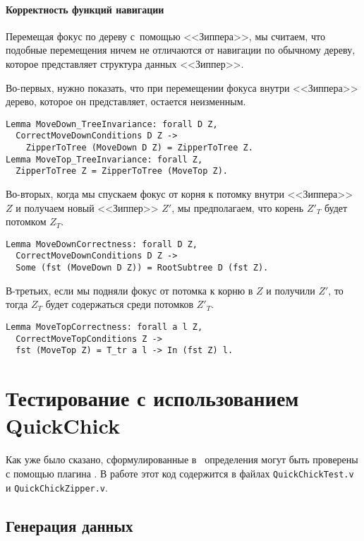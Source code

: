 \paragraph{Корректность функций навигации}

Перемещая фокус по дереву с~помощью <<Зиппера>>, мы считаем, что подобные перемещения ничем не отличаются от навигации по обычному дереву, которое представляет структура данных <<Зиппер>>.

Во-первых, нужно показать, что при перемещении фокуса внутри <<Зиппера>> дерево, которое он представляет, остается неизменным.

\begin{Verbatim}[fontsize=\small]
Lemma MoveDown_TreeInvariance: forall D Z,
  CorrectMoveDownConditions D Z ->
  	ZipperToTree (MoveDown D Z) = ZipperToTree Z.
Lemma MoveTop_TreeInvariance: forall Z,
  ZipperToTree Z = ZipperToTree (MoveTop Z).
\end{Verbatim}

Во-вторых, когда мы спускаем фокус от корня к потомку внутри <<Зиппера>> $Z$ и получаем новый <<Зиппер>> $Z'$, мы предполагаем, что корень $Z'_T$ будет потомком $Z_T$.  
\begin{Verbatim}[fontsize=\small]
Lemma MoveDownCorrectness: forall D Z,
  CorrectMoveDownConditions D Z ->
  Some (fst (MoveDown D Z)) = RootSubtree D (fst Z).
\end{Verbatim}

В-третьих, если мы подняли фокус от потомка к корню в $Z$ и получили $Z'$, то тогда $Z_T$ будет содержаться среди потомков $Z'_T$.
\begin{Verbatim}[fontsize=\small]
Lemma MoveTopCorrectness: forall a l Z,
  CorrectMoveTopConditions Z ->
  fst (MoveTop Z) = T_tr a l -> In (fst Z) l.
\end{Verbatim}

\section{Тестирование с использованием QuickChick}

Как уже было сказано, сформулированные в \tcoq~определения могут быть проверены с помощью плагина \tqc. В работе этот код содержится в файлах \texttt{QuickChickTest.v} и \texttt{QuickChickZipper.v}.

\subsection{Генерация данных}

